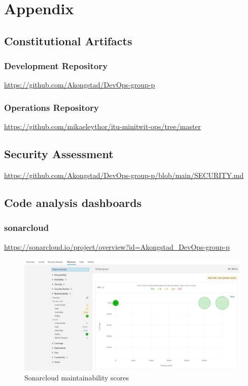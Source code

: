 \section{Appendix}
\label{app}

\subsection{Constitutional Artifacts}
\label{app:constArts}

\subsubsection{Development Repository}
\label{app:devRepo}
\href{https://github.com/Akongstad/DevOps-group-p}{https://github.com/Akongstad/DevOps-group-p}

\subsubsection{Operations Repository}
\label{app:opsRepo}
\href{https://github.com/mikaeleythor/itu-minitwit-ops/tree/master}{https://github.com/mikaeleythor/itu-minitwit-ops/tree/master}

\subsection{Security Assessment}
\label{app:secAss}
\href{https://github.com/Akongstad/DevOps-group-p/blob/main/SECURITY.md}{https://github.com/Akongstad/DevOps-group-p/blob/main/SECURITY.md}

\subsection{Code analysis dashboards}
\label{app:codeAnal}

\subsubsection{sonarcloud}
\label{app:codeAnalSonar}
\href{https://sonarcloud.io/project/overview?id=Akongstad_DevOps-group-p}{https://sonarcloud.io/project/overview?id=Akongstad_DevOps-group-p}

\begin {figure}[H]
    \centering
    \includegraphics[scale=0.42]{images/analys debt.PNG}
    \caption{Sonarcloud maintainability scores}
    \label{fig:cloudMaintainability}
\end{figure}

